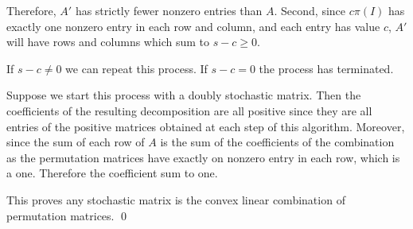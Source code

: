 \documentclass[10pt]{article}
\begin{document}
\begin{solution}
\begin{enumerate}
        Therefore, \( A' \) has strictly fewer nonzero entries than \( A \). Second, since \( c\pi(I) \) has exactly one nonzero entry in each row and column, and each entry has value \( c \), \( A' \) will have rows and columns which sum to \( s-c \geq 0 \).

        If \( s-c\neq 0 \) we can repeat this process. If \( s-c=0 \) the process has terminated.

        \vspace{1em}
        Suppose we start this process with a doubly stochastic matrix.
        Then the coefficients of the resulting decomposition are all positive since they are all entries of the positive matrices obtained at each step of this algorithm. Moreover, since the sum of each row of \( A \) is the sum of the coefficients of the combination as the permutation matrices have exactly on nonzero entry in each row, which is a one. Therefore the coefficient sum to one.

        This proves any stochastic matrix is the convex linear combination of permutation matrices. \qed

\end{enumerate}
\end{solution}
\end{document}
